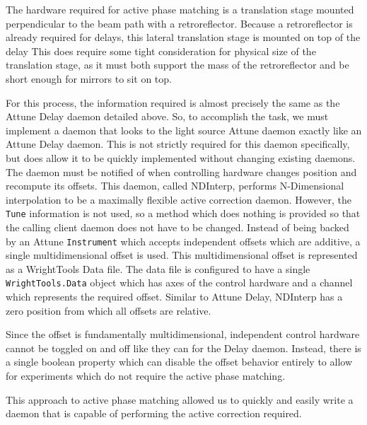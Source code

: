 The hardware required for active phase matching is a translation stage mounted perpendicular to the beam path with a retroreflector.
Because a retroreflector is already required for delays, this lateral translation stage is mounted on top of the delay
This does require some tight consideration for physical size of the translation stage, as it must both support the mass of the retroreflector and be short enough for mirrors to sit on top.

For this process, the information required is almost precisely the same as the Attune Delay daemon detailed above.
So, to accomplish the task, we must implement a daemon that looks to the light source Attune daemon exactly like an Attune Delay daemon.
This is not strictly required for this daemon specifically, but does allow it to be quickly implemented without changing existing daemons.
The daemon must be notified of when controlling hardware changes position and recompute its offsets.
This daemon, called NDInterp, performs N-Dimensional interpolation to be a maximally flexible active correction daemon.
However, the \texttt{Tune} information is not used, so a method which does nothing is provided so that the calling client daemon does not have to be changed. 
Instead of being backed by an Attune \texttt{Instrument} which accepts independent offsets which are additive, a single multidimensional offset is used.
This multidimensional offset is represented as a WrightTools Data file.
The data file is configured to have a single \texttt{WrightTools.Data} object which has axes of the control hardware and a channel which represents the required offset.
Similar to Attune Delay, NDInterp has a zero position from which all offsets are relative.

Since the offset is fundamentally multidimensional, independent control hardware cannot be toggled on and off like they can for the Delay daemon.
Instead, there is a single boolean \yaq{} property which can disable the offset behavior entirely to allow for experiments which do not require the active phase matching.

This approach to active phase matching allowed us to quickly and easily write a daemon that is capable of performing the active correction required.

\clearpage
